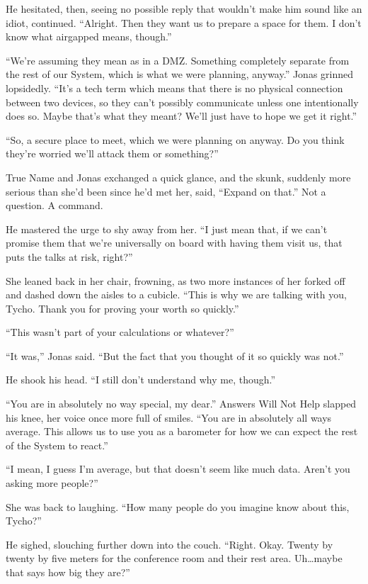 He hesitated, then, seeing no possible reply that wouldn't make him sound like an idiot, continued. ``Alright. Then they want us to prepare a space for them. I don't know what airgapped means, though.''

``We're assuming they mean as in a DMZ. Something completely separate from the rest of our System, which is what we were planning, anyway.'' Jonas grinned lopsidedly. ``It's a tech term which means that there is no physical connection between two devices, so they can't possibly communicate unless one intentionally does so. Maybe that's what they meant? We'll just have to hope we get it right.''

``So, a secure place to meet, which we were planning on anyway. Do you think they're worried we'll attack them or something?''

True Name and Jonas exchanged a quick glance, and the skunk, suddenly more serious than she'd been since he'd met her, said, ``Expand on that.'' Not a question. A command.

He mastered the urge to shy away from her. ``I just mean that, if we can't promise them that we're universally on board with having them visit us, that puts the talks at risk, right?''

She leaned back in her chair, frowning, as two more instances of her forked off and dashed down the aisles to a cubicle. ``This is why we are talking with you, Tycho. Thank you for proving your worth so quickly.''

``This wasn't part of your calculations or whatever?''

``It was,'' Jonas said. ``But the fact that you thought of it so quickly was not.''

He shook his head. ``I still don't understand why me, though.''

``You are in absolutely no way special, my dear.'' Answers Will Not Help slapped his knee, her voice once more full of smiles. ``You are in absolutely all ways average. This allows us to use you as a barometer for how we can expect the rest of the System to react.''

``I mean, I guess I'm average, but that doesn't seem like much data. Aren't you asking more people?''

She was back to laughing. ``How many people do you imagine know about this, Tycho?''

He sighed, slouching further down into the couch. ``Right. Okay. Twenty by twenty by five meters for the conference room and their rest area. Uh\ldots maybe that says how big they are?''

